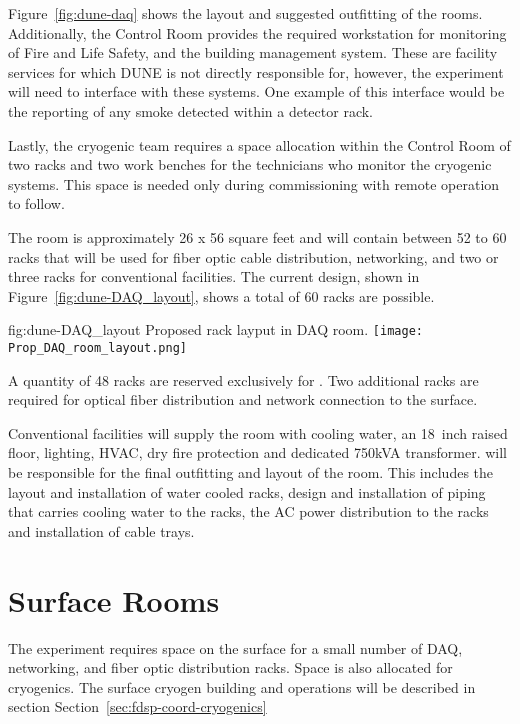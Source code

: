 Figure~\ref{fig:dune-daq} shows the layout and suggested outfitting of the rooms. Additionally, the Control Room provides the required workstation for
monitoring of Fire and Life Safety, and the building management system.  These are facility services for which DUNE is not directly responsible for, however, the experiment will need to interface with these systems.  One example of this interface would be the reporting of any smoke detected within a detector rack.

Lastly, the cryogenic team requires a space allocation within the Control Room of two racks and two work benches for the technicians who monitor the cryogenic systems.  This space is needed only during commissioning with remote operation to follow.
       
The  room is approximately 26 x 56 square feet and will contain between 52 to 60 racks that will be
used for fiber optic cable distribution, networking, 
 and two or three racks for conventional facilities.  The current design, shown in Figure~\ref{fig:dune-DAQ_layout}, shows a total of 60 racks are possible.

\begin{dunefigure}{fig:dune-DAQ_layout}
  {Proposed rack layput in DAQ room.}
  \texttt{[image: Prop\_DAQ\_room\_layout.png]}
\end{dunefigure}
  

A quantity of 48 racks are reserved exclusively for .  Two additional racks are required for optical fiber distribution and network connection to the surface.

Conventional facilities will supply the  room with cooling
water, an 18~inch raised floor, lighting, HVAC, dry fire protection
and dedicated 750kVA transformer.   will be responsible for
the final outfitting and layout of the room.  This includes the layout
and installation of water cooled racks, design and installation of
piping that carries cooling water to the racks, the AC power
distribution to the racks and installation of cable trays.

\section{Surface Rooms}
\label{sec:fdsp-coord-surf-rooms}

The  experiment requires space on the surface for a small number of DAQ, networking, and fiber optic distribution racks.  Space is also allocated for cryogenics.  The surface cryogen building and operations will be described in section Section~\ref{sec:fdsp-coord-cryogenics}

